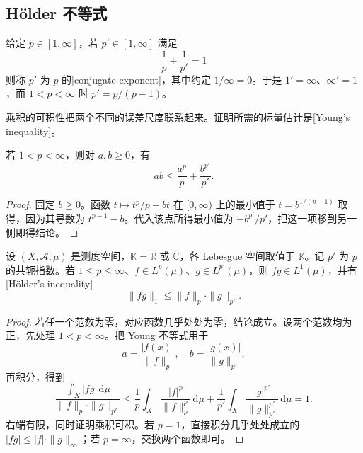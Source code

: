 \subsection{Hölder 不等式}
\label{b1:subsec:100103}

\begin{definition}\label{b1:def:conjugate-exponent}
给定 \(p\in[1,\infty]\)，若 \(p'\in[1,\infty]\) 满足
\[
 \frac1p+\frac1{p'}=1
\]
则称 \(p'\) 为 \(p\) 的[conjugate exponent]，其中约定 \(1/\infty=0\)。于是 \(1'=\infty\)、\(\infty'=1\)，而 \(1<p<\infty\) 时 \(p'=p/(p-1)\)。
\end{definition}

乘积的可积性把两个不同的误差尺度联系起来。证明所需的标量估计是[Young's inequality]。

\begin{lemma}[Young]\label{b1:lem:young-product}
若 \(1<p<\infty\)，则对 \(a,b\geq0\)，有
\[
 ab\leq\frac{a^p}{p}+\frac{b^{p'}}{p'}.
\]
\end{lemma}
\begin{proof}
固定 \(b\geq0\)。函数 \(t\mapsto t^p/p-bt\) 在 \([0,\infty)\) 上的最小值于 \(t=b^{1/(p-1)}\) 取得，因为其导数为 \(t^{p-1}-b\)。代入该点所得最小值为 \(-b^{p'}/p'\)，把这一项移到另一侧即得结论。
\end{proof}

\begin{theorem}[Hölder]\label{b1:thm:lp-holder}
设 \((X,\mathcal A,\mu)\) 是测度空间，\(\mathbb K=\mathbb R\) 或 \(\mathbb C\)，各 Lebesgue 空间取值于 \(\mathbb K\)。记 \(p'\) 为 \(p\) 的共轭指数。若 \(1\leq p\leq\infty\)、\(f\in L^p(\mu)\)、\(g\in L^{p'}(\mu)\)，则 \(fg\in L^1(\mu)\)，并有[Hölder's inequality]
\[
 \|fg\|_1\leq\|f\|_p\cdot\|g\|_{p'}.
\]
\end{theorem}
\begin{proof}
若任一个范数为零，对应函数几乎处处为零，结论成立。设两个范数均为正，先处理 \(1<p<\infty\)。把 Young 不等式用于
\[
 a=\frac{|f(x)|}{\|f\|_p},\quad b=\frac{|g(x)|}{\|g\|_{p'}},
\]
再积分，得到
\[
 \frac{\int_X|fg|\,\mathrm d\mu}{\|f\|_p\cdot\|g\|_{p'}}
 \leq\frac1p\int_X\frac{|f|^p}{\|f\|_p^p}\,\mathrm d\mu
 +\frac1{p'}\int_X\frac{|g|^{p'}}{\|g\|_{p'}^{p'}}\,\mathrm d\mu
 =1.
\]
右端有限，同时证明乘积可积。若 \(p=1\)，直接积分几乎处处成立的 \(|fg|\leq|f|\cdot\|g\|_\infty\)；若 \(p=\infty\)，交换两个函数即可。
\end{proof}

